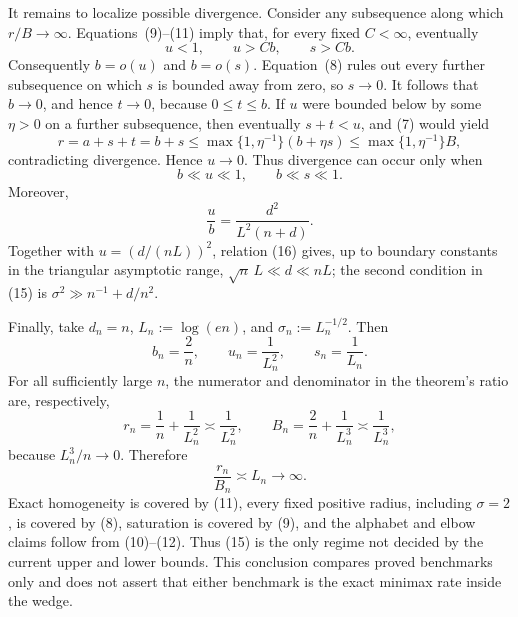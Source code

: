It remains to localize possible divergence.  Consider any subsequence along which \(r/B\to\infty\).  Equations~(9)--(11) imply that, for every fixed \(C<\infty\), eventually
\[
 u<1,\qquad u>Cb,\qquad s>Cb.
\tag{13}
\]
Consequently \(b=o(u)\) and \(b=o(s)\).  Equation~(8) rules out every further subsequence on which \(s\) is bounded away from zero, so \(s\to0\).  It follows that \(b\to0\), and hence \(t\to0\), because \(0\le t\le b\).  If \(u\) were bounded below by some \(\eta>0\) on a further subsequence, then eventually \(s+t<u\), and (7) would yield
\[
 r=a+s+t=b+s
 \le \max\{1,\eta^{-1}\}(b+\eta s)
 \le \max\{1,\eta^{-1}\}B,
\tag{14}
\]
contradicting divergence.  Hence \(u\to0\).  Thus divergence can occur only when
\[
 b\ll u\ll1,
 \qquad b\ll s\ll1.
\tag{15}
\]
Moreover,
\[
 \frac ub=\frac{d^2}{L^2(n+d)}.
\tag{16}
\]
Together with \(u=(d/(nL))^2\), relation (16) gives, up to boundary constants in the triangular asymptotic range, \(\sqrt n\,L\ll d\ll nL\); the second condition in (15) is \(\sigma^2\gg n^{-1}+d/n^2\).

Finally, take \(d_n=n\), \(L_n:=\log(en)\), and \(\sigma_n:=L_n^{-1/2}\).  Then
\[
 b_n=\frac2n,\qquad u_n=\frac1{L_n^2},
 \qquad s_n=\frac1{L_n}.
\tag{17}
\]
For all sufficiently large \(n\), the numerator and denominator in the theorem's ratio are, respectively,
\[
 r_n=\frac1n+\frac1{L_n^2}\asymp\frac1{L_n^2},
 \qquad
 B_n=\frac2n+\frac1{L_n^3}\asymp\frac1{L_n^3},
\tag{18}
\]
because \(L_n^3/n\to0\).  Therefore
\[
 \frac{r_n}{B_n}\asymp L_n\longrightarrow\infty.
\tag{19}
\]
Exact homogeneity is covered by (11), every fixed positive radius, including \(\sigma=2\), is covered by (8), saturation is covered by (9), and the alphabet and elbow claims follow from (10)--(12).  Thus (15) is the only regime not decided by the current upper and lower bounds.  This conclusion compares proved benchmarks only and does not assert that either benchmark is the exact minimax rate inside the wedge.